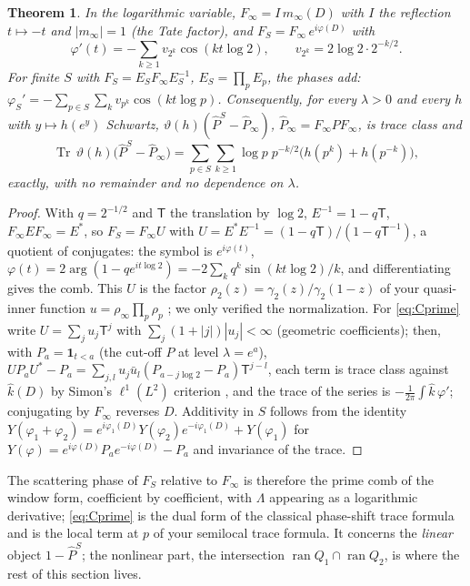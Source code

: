 \documentclass[11pt]{amsart}
\newtheorem{theorem}{Theorem}[section]
\theoremstyle{definition}
\theoremstyle{remark}
\newcommand{\Tr}{\operatorname{Tr}}
\newcommand{\ran}{\operatorname{ran}}
\newcommand{\Pih}{\widehat P}
\begin{document}
\begin{theorem}\label{thm:phase}
In the logarithmic variable, $F_\infty=I\,m_\infty(D)$ with $I$ the reflection $t\mapsto-t$ and $|m_\infty|=1$ (the Tate
factor), and $F_S=F_\infty\,e^{i\varphi(D)}$ with
\[
\varphi'(t)=-\sum_{k\ge1}v_{2^k}\cos(kt\log2),\qquad v_{2^k}=2\log2\cdot2^{-k/2}.
\]
For finite $S$ with $F_S=E_SF_\infty E_S^{-1}$, $E_S=\prod_pE_p$, the phases add: $\varphi_S'=-\sum_{p\in S}\sum_kv_{p^k}\cos(kt\log p)$.
Consequently, for every $\lambda>0$ and every $h$ with $y\mapsto h(e^y)$ Schwartz, $\vartheta(h)(\Pih^S-\Pih_\infty)$, $\Pih_\infty=F_\infty PF_\infty$, is trace class and
\begin{equation}\label{eq:Cprime}
\Tr\,\vartheta(h)\big(\Pih^S-\Pih_\infty\big)=\sum_{p\in S}\sum_{k\ge1}\log p\;p^{-k/2}\big(h(p^k)+h(p^{-k})\big),
\end{equation}
exactly, with no remainder and no dependence on $\lambda$.
\end{theorem}
\begin{proof}
With $q=2^{-1/2}$ and $\mathsf T$ the translation by $\log2$, $E^{-1}=1-q\mathsf T$, $F_\infty EF_\infty=E^*$, so
$F_S=F_\infty U$ with $U=E^*E^{-1}=(1-q\mathsf T)/(1-q\mathsf T^{-1})$, a quotient of conjugates: the symbol is
$e^{i\varphi(t)}$, $\varphi(t)=2\arg(1-qe^{it\log2})=-2\sum_kq^k\sin(kt\log2)/k$, and differentiating gives the comb. This $U$ is
the factor $\rho_2(z)=\gamma_2(z)/\gamma_2(1-z)$ of your quasi-inner function $u=\rho_\infty\prod_p\rho_p$
\cite[Lemma~3.1]{CCquasi}; we only verified the normalization. For \eqref{eq:Cprime} write $U=\sum_ju_j\mathsf T^{j}$ with
$\sum_j(1+|j|)|u_j|<\infty$ (geometric coefficients); then, with $P_a=\mathbf 1_{t<a}$ (the cut-off $P$ at level $\lambda=e^a$), $UP_aU^*-P_a=\sum_{j,l}u_j\bar u_l(P_{a-j\log2}-P_a)\mathsf T^{j-l}$,
each term is trace class against $\widehat k(D)$ by Simon's $\ell^1(L^2)$ criterion \cite[Thm.~4.5]{Simon}, and the trace of the
series is $-\frac1{2\pi}\int\widehat k\,\varphi'$; conjugating by $F_\infty$ reverses $D$. Additivity in $S$ follows from the
identity $Y(\varphi_1+\varphi_2)=e^{i\varphi_1(D)}Y(\varphi_2)e^{-i\varphi_1(D)}+Y(\varphi_1)$ for
$Y(\varphi)=e^{i\varphi(D)}P_ae^{-i\varphi(D)}-P_a$ and invariance of the trace.
\end{proof}

The scattering phase of $F_S$ relative to $F_\infty$ is therefore the prime comb of the window form, coefficient by
coefficient, with $\Lambda$ appearing as a logarithmic derivative; \eqref{eq:Cprime} is the dual form of the classical
phase-shift trace formula and is the local term at $p$ of your semilocal trace formula. It concerns the \emph{linear}
object $1-\Pih^S$; the nonlinear part, the intersection $\ran Q_1\cap\ran Q_2$, is where the rest of this section lives.
\end{document}
